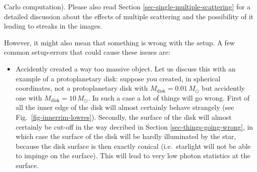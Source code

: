 \documentclass{report}
\begin{document}
\begin{enumerate}
\begin{enumerate}
      Carlo computation). Please also read Section \ref{sec-single-multiple-scattering}
      for a detailed discussion about the effects of multiple scattering
      and the possibility of it leading to streaks in the images.
  \end{enumerate}
  However, it might also mean that something is wrong with the setup. A few
  common setup-errors that could cause these issues are:
  \begin{itemize}
  \item Accidently created a way too massive object. Let us discuss this
    with an example of a protoplanetary disk: suppose you created, in
    spherical coordinates, not a protoplanetary disk with
    $M_{\mathrm{disk}}=0.01\,M_{\odot}$ but accidently one with
    $M_{\mathrm{disk}}=10\,M_{\odot}$. In such a case a lot of things will
    go wrong. First of all the inner edge of the disk will almost certainly
    behave strangely (see Fig.~\ref{fig-innerrim-lowres}). Secondly, the
    surface of the disk will almost certainly be cut-off in the way decribed
    in Section \ref{sec-things-going-wrong}, in which case the surface of
    the disk will be hardly illuminated by the star, because the disk
    surface is then exactly conical (i.e.\ starlight will not be able to
    impinge on the surface). This will lead to very low photon statistics
    at the surface. 
  \end{itemize}
\end{enumerate}



% 




\end{document}
